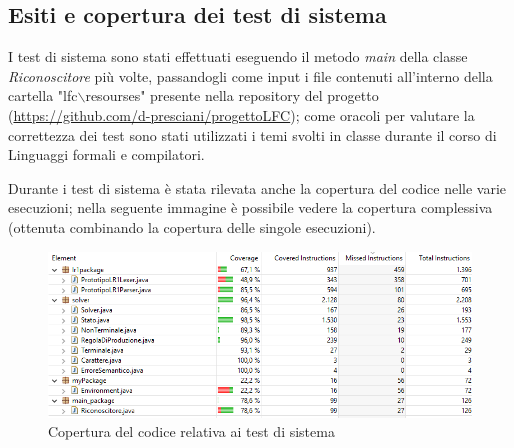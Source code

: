 \documentclass[12pt]{article}
\begin{document}
\subsection{Esiti e copertura dei test di sistema}
I test di sistema sono stati effettuati eseguendo il metodo \textit{main} della classe \textit{Riconoscitore} più volte, passandogli come input i file contenuti all'interno della cartella "lfc$\backslash$resourses" presente nella repository del progetto (\url{https://github.com/d-presciani/progettoLFC}); come oracoli per valutare la correttezza dei test sono stati utilizzati i temi svolti in classe durante il corso di Linguaggi formali e compilatori. \par
Durante i test di sistema è stata rilevata anche la copertura del codice nelle varie esecuzioni; nella seguente immagine è possibile vedere la copertura complessiva (ottenuta combinando la copertura delle singole esecuzioni).
\begin{figure}[h]
\centering
\includegraphics[width=\textwidth]{immagini/codeCoverage.png}
\caption{Copertura del codice relativa ai test di sistema}
\end{figure}
\end{document}
